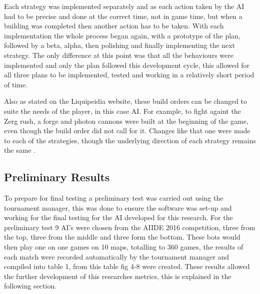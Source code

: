 \documentclass[journal]{IEEEtran}
\begin{document}
Each strategy was implemented separately and as each action taken by the AI had to be precise and done at the correct time, not in game time, but when a building was completed then another action has to be taken. With each implementation the whole process began again, with a prototype of the plan, followed by a beta, alpha, then polishing and finally implementing the next strategy. The only difference at this point was that all the behaviours were implemented and only the plan followed this development cycle, this allowed for all three plans to be implemented, tested and working in a relatively short period of time.

Also as stated on the Liquipeidia website, these build orders can be changed to suite the needs of the player, in this case AI. For example, to fight againt the Zerg rush, a forge and photon cannons were built at the beginning of the game, even though the build order did not call for it. Changes like that one were made to each of the strategies, though the underlying direction of each strategy remains the same \cite{Alter}.

\subsection{Preliminary Results}
To prepare for final testing a preliminary test was carried out using the tournament manager, this was done to ensure the software was set-up and working for the final testing for the AI developed for this research. For the preliminary test 9 AI's were chosen from the AIIDE 2016 competition, three from the top, three from the middle and three form the bottom. These bots would then play one on one games on 10 maps, totalling to 360 games, the results of each match were recorded automatically by the tournament manager and compiled into table 1, from this table fig 4-8 were created. These results allowed the further development of this researches metrics, this is explained in the following section.
\end{document}
